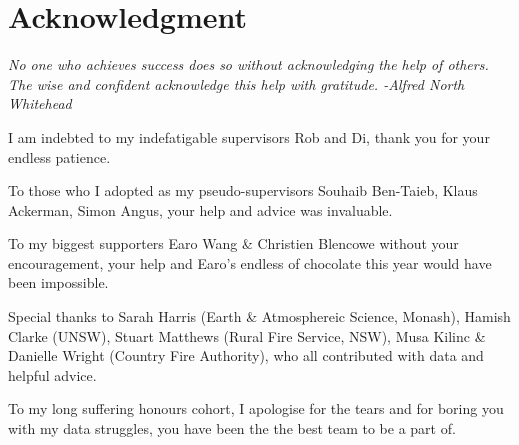 \documentclass{article}
\begin{document}
\section*{Acknowledgment}
\textit{No one who achieves success does so without acknowledging the help of others. The wise and confident acknowledge this help with gratitude. -Alfred North Whitehead
	}
	
I am indebted to my indefatigable supervisors Rob and Di, thank you for your endless patience. 

To those who I adopted as my pseudo-supervisors Souhaib Ben-Taieb, Klaus Ackerman, Simon Angus, your help and advice was invaluable.

To my biggest supporters Earo Wang \& Christien Blencowe without your encouragement, your help and Earo's endless of chocolate this year would have been impossible.

Special thanks to Sarah Harris (Earth \& Atmosphereic Science, Monash), Hamish Clarke (UNSW), Stuart Matthews (Rural Fire Service, NSW), Musa Kilinc \& Danielle Wright (Country Fire Authority), who all contributed with data and helpful advice.

To my long suffering honours cohort, I apologise for the tears and for boring you with my data struggles, you have been the the best team to be a part of. 




\end{document}
